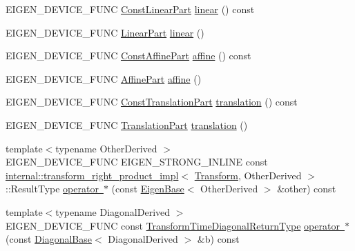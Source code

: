 \begin{DoxyCompactItemize}
\item 
E\+I\+G\+E\+N\+\_\+\+D\+E\+V\+I\+C\+E\+\_\+\+F\+U\+NC \mbox{\hyperlink{class_eigen_1_1_transform_ac3327ee95457c915e422ff85002e02aa}{Const\+Linear\+Part}} \mbox{\hyperlink{class_eigen_1_1_transform_a535bd63d047c2a36585c3f9b62219a1e}{linear}} () const
\item 
E\+I\+G\+E\+N\+\_\+\+D\+E\+V\+I\+C\+E\+\_\+\+F\+U\+NC \mbox{\hyperlink{class_eigen_1_1_transform_a1441ef7d89d1f4cebd061db33b993cf2}{Linear\+Part}} \mbox{\hyperlink{class_eigen_1_1_transform_a540cef80cd714fa01d124536d39ac8da}{linear}} ()
\item 
E\+I\+G\+E\+N\+\_\+\+D\+E\+V\+I\+C\+E\+\_\+\+F\+U\+NC \mbox{\hyperlink{class_eigen_1_1_transform_adfa0bf2d9504548cdc9b9051b2fa9673}{Const\+Affine\+Part}} \mbox{\hyperlink{class_eigen_1_1_transform_a88c996ca4cccf46ab4d520b7d99c332b}{affine}} () const
\item 
E\+I\+G\+E\+N\+\_\+\+D\+E\+V\+I\+C\+E\+\_\+\+F\+U\+NC \mbox{\hyperlink{class_eigen_1_1_transform_a8319bad977b0dabf2dfaf2e2dc30f13e}{Affine\+Part}} \mbox{\hyperlink{class_eigen_1_1_transform_a77b379a598ff0e570a8112db65111a94}{affine}} ()
\item 
E\+I\+G\+E\+N\+\_\+\+D\+E\+V\+I\+C\+E\+\_\+\+F\+U\+NC \mbox{\hyperlink{class_eigen_1_1_transform_a3eab3259d3fac8106eb3139bc96ba852}{Const\+Translation\+Part}} \mbox{\hyperlink{class_eigen_1_1_transform_afa93ba97d26912bb3d8777cbed102045}{translation}} () const
\item 
E\+I\+G\+E\+N\+\_\+\+D\+E\+V\+I\+C\+E\+\_\+\+F\+U\+NC \mbox{\hyperlink{class_eigen_1_1_transform_aabeaa2d375bf1b6b1d5cb5d1904fbd06}{Translation\+Part}} \mbox{\hyperlink{class_eigen_1_1_transform_ae76fc36f20276787741859cb5ebd5901}{translation}} ()
\item 
{\footnotesize template$<$typename Other\+Derived $>$ }\\E\+I\+G\+E\+N\+\_\+\+D\+E\+V\+I\+C\+E\+\_\+\+F\+U\+NC E\+I\+G\+E\+N\+\_\+\+S\+T\+R\+O\+N\+G\+\_\+\+I\+N\+L\+I\+NE const \mbox{\hyperlink{struct_eigen_1_1internal_1_1transform__right__product__impl}{internal\+::transform\+\_\+right\+\_\+product\+\_\+impl}}$<$ \mbox{\hyperlink{class_eigen_1_1_transform}{Transform}}, Other\+Derived $>$\+::Result\+Type \mbox{\hyperlink{class_eigen_1_1_transform_ac23901d6db87bc853bc3e20eda4928e9}{operator $\ast$}} (const \mbox{\hyperlink{struct_eigen_1_1_eigen_base}{Eigen\+Base}}$<$ Other\+Derived $>$ \&other) const
\item 
{\footnotesize template$<$typename Diagonal\+Derived $>$ }\\E\+I\+G\+E\+N\+\_\+\+D\+E\+V\+I\+C\+E\+\_\+\+F\+U\+NC const \mbox{\hyperlink{class_eigen_1_1_transform_a51af5e8d8d9d9bfec091ff8aa5b7845a}{Transform\+Time\+Diagonal\+Return\+Type}} \mbox{\hyperlink{class_eigen_1_1_transform_a27fcd229f83b104448d753298fc00df4}{operator $\ast$}} (const \mbox{\hyperlink{class_eigen_1_1_diagonal_base}{Diagonal\+Base}}$<$ Diagonal\+Derived $>$ \&b) const

\end{DoxyCompactItemize}
